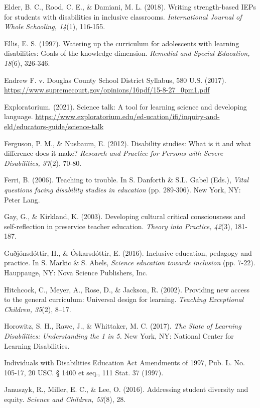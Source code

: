 \documentclass[11.5pt]{sig-alternate}
\begin{document}
Elder, B. C., Rood, C. E., \& Damiani, M. L. (2018). Writing strength-based IEPs for students with disabilities in inclusive classrooms. \textit{International Journal of Whole Schooling, 14}(1), 116-155.

Ellis, E. S. (1997). Watering up the curriculum for adolescents with learning disabilities: Goals of the knowledge dimension. \textit{Remedial and Special Education, 18}(6), 326-346.

Endrew F. v. Douglas County School District Syllabus, 580 U.S. (2017). \url{https://www.supremecourt.gov/opinions/16pdf/15-8-27\_0pm1.pdf}

Exploratorium. (2021). Science talk: A tool for learning science and developing language. \url{https://www.exploratorium.edu/ed-ucation/ifi/inquiry-and-eld/educators-guide/science-talk}

Ferguson, P. M., \& Nusbaum, E. (2012). Disability studies: What is it and what difference does it make? \textit{Research and Practice for Persons with Severe Disabilities, 37}(2), 70-80.

Ferri, B. (2006). Teaching to trouble. In S. Danforth \& S.L. Gabel (Eds.), \textit{Vital questions facing disability studies in education} (pp. 289-306). New York, NY: Peter Lang.

Gay, G., \& Kirkland, K. (2003). Developing cultural critical consciousness and self-reflection in preservice teacher education. \textit{Theory into Practice, 42}(3), 181-187.

Guðjónsdóttir, H., \& Óskarsdóttir, E. (2016). Inclusive education, pedagogy and practice. In S. Markic \& S. Abels, \textit{Science education towards inclusion} (pp. 7-22). Hauppauge, NY: Nova Science Publishers, Inc.

Hitchcock, C., Meyer, A., Rose, D., \& Jackson, R. (2002). Providing new access to the general curriculum: Universal design for learning. \textit{Teaching Exceptional Children, 35}(2), 8–17. 

Horowitz, S. H., Rawe, J., \& Whittaker, M. C. (2017). \textit{The State of Learning Disabilities: Understanding the 1 in 5.} New York, NY: National Center for Learning Disabilities.

Individuals with Disabilities Education Act Amendments of 1997, Pub. L. No. 105-17, 20 USC. § 1400 et seq., 111 Stat. 37 (1997). 

Januszyk, R., Miller, E. C., \& Lee, O. (2016). Addressing student diversity and equity. \textit{Science and Children, 53}(8), 28.
\end{document}
